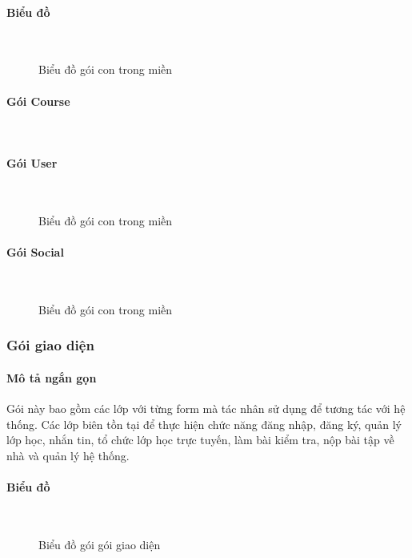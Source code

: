 \documentclass[./../main_file.tex]{subfiles}
\begin{document}
	\paragraph{Biểu đồ} ~\\
	\begin{figure}[htb]
		\centering
		\resizebox{0.6\textwidth}{!}{}
		\caption{Biểu đồ gói con trong miền}
	\end{figure}

	\paragraph{Gói Course} ~\\
		
	\paragraph{Gói User} ~\\
	\begin{figure}[H]
		\centering
		\resizebox{1.0\textwidth}{!}{}
		\caption{Biểu đồ gói con trong miền}
	\end{figure}

	\paragraph{Gói Social}~\\
	\begin{figure}[H]
		\centering
		\resizebox{0.7\textwidth}{!}{}
		\caption{Biểu đồ gói con trong miền}
	\end{figure}
	
	\subsubsection{Gói giao diện}
	\paragraph{Mô tả ngắn gọn}
	Gói này bao gồm các lớp với từng form mà tác nhân sử dụng để tương tác với hệ thống. Các lớp biên tồn tại để thực hiện chức năng đăng nhập, đăng ký, quản lý lớp học, nhắn tin, tổ chức lớp học trực tuyến, làm bài kiểm tra, nộp bài tập về nhà và quản lý hệ thống.
	\paragraph{Biểu đồ} ~\\
	\begin{figure}[H]
		\centering
		\resizebox{1.0\textwidth}{!}{}
		\caption{Biểu đồ gói gói giao diện}
	\end{figure}
\end{document}
